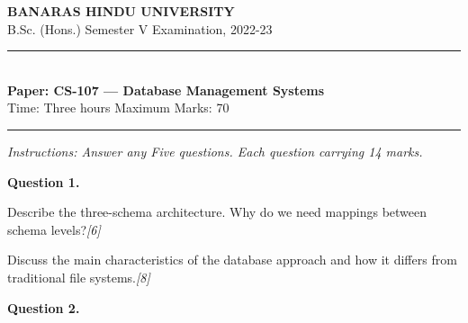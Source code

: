 \documentclass[11pt,a4paper]{article}
\newcommand{\pts}[1]{\hfill   \textit{[#1]}}
\begin{document}
\begin{center}
  {\large\bfseries BANARAS HINDU UNIVERSITY}\\[2pt]
  {\normalsize B.Sc. (Hons.) Semester V Examination, 2022-23}\\[6pt]
  \rule{0.8\linewidth}{0.5pt}\\[6pt]
  {\large\bfseries Paper: CS-107 --- Database Management Systems}\\[4pt]
  {\normalsize Time: Three hours \hfill Maximum Marks: 70}
\end{center}

\rule{\linewidth}{0.4pt}

\smallskip



\noindent   \textit{Instructions: Answer any Five questions. Each question carrying 14 marks.}

\bigskip

\medskip


\noindent   \textbf{Question 1.}

\begin{parts}
  \item Describe the three-schema architecture. Why do we need mappings between schema levels?\pts{6}
  \item Discuss the main characteristics of the database approach and how it differs from traditional file systems.\pts{8}
\end{parts}

\medskip


\noindent   \textbf{Question 2.}
\end{document}
